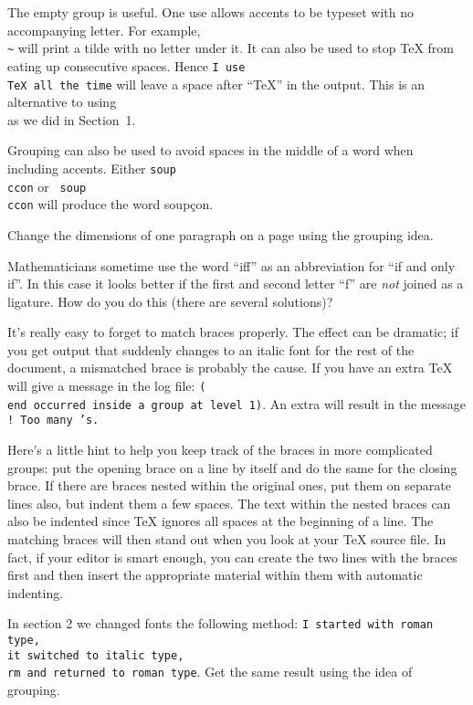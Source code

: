 The empty group {\tt\lb\rb} is useful.  One use allows accents to be 
typeset with no accompanying letter.  For example, {\tt \\\~{}\lb\rb} 
will print a tilde with no letter under it.  It can also be used to 
stop \TeX{} from eating up consecutive spaces. Hence {\tt I use 
\\TeX\lb\rb{} all the time}  will leave a space after ``\TeX'' in the 
output. This is an alternative to using {\tt \\\sp} as we did in 
Section~1. 
 
Grouping can also be used to avoid spaces in the middle of a word 
when including accents. Either {\tt soup\\c\sp con} or {\tt 
soup\\c\lb c\rb on} will produce the word soup\c{c}on. 
 
\exercise Change the dimensions of one paragraph on a page using the 
grouping idea. 
 
\exercise Mathematicians sometime use the word ``i{f}f'' as an 
abbreviation for ``if and only if''\null.  In this case it looks 
better if the first and second letter ``f'' are {\sl not\/} 
joined as a ligature.  How do you do this (there are several 
solutions)? 
 
It's really easy to forget to match braces properly.  The effect 
can be dramatic; if you get output that suddenly changes to an 
italic font for the rest of the document, a mismatched brace is 
probably the cause.  If you have an extra {\tt \lb} \TeX{} will 
give a message in the log file: {\tt (\\end occurred inside a 
group at level 1)}. An extra {\tt\rb} will result in the message 
\hbox{\tt! Too many \rb's.} 
 
Here's a little hint to help you keep track of the braces in more 
complicated groups: put the opening brace on a line by itself and 
do the same for the closing brace.  If there are braces nested 
within the original ones, put them on separate lines also, but 
indent them a few spaces.  The text within the nested braces can 
also be indented since \TeX{} ignores all spaces at the beginning 
of a line. The matching braces will then stand out when you look 
at your \TeX{} source file.  In fact, if your editor is smart 
enough, you can create the two lines with the braces first and 
then insert the appropriate material within them with automatic 
indenting. 
 
\exercise In section 2 we changed fonts the following method: 
{\tt I started with roman type, \\it switched to italic type, 
\\rm and returned to roman type}. Get the same result using the 
idea of grouping. 
 
